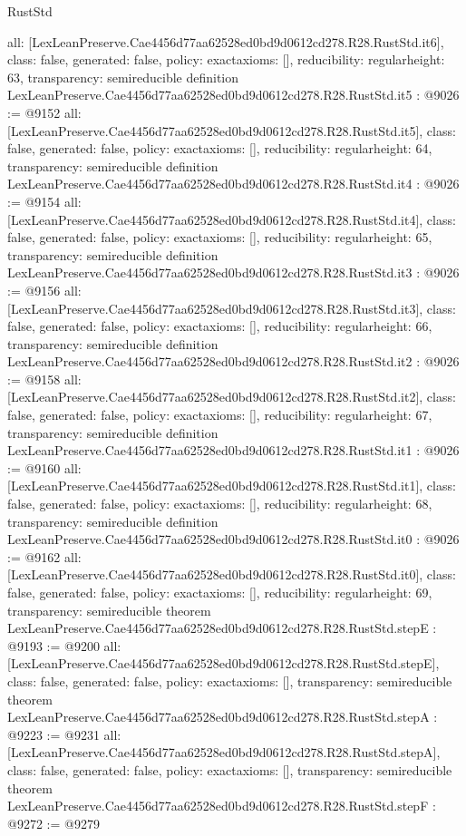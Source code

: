 \begin{lexlean}{RustStd}
\begin{coremodule}
{  all: [LexLeanPreserve.Cae4456d77aa62528ed0bd9d0612cd278.R28.RustStd.it6],
  class: false,
  generated: false,
  policy: exact{axioms: []},
  reducibility: regular{height: 63},
  transparency: semireducible
}
definition LexLeanPreserve.Cae4456d77aa62528ed0bd9d0612cd278.R28.RustStd.it5 : @9026 := @9152 {
  all: [LexLeanPreserve.Cae4456d77aa62528ed0bd9d0612cd278.R28.RustStd.it5],
  class: false,
  generated: false,
  policy: exact{axioms: []},
  reducibility: regular{height: 64},
  transparency: semireducible
}
definition LexLeanPreserve.Cae4456d77aa62528ed0bd9d0612cd278.R28.RustStd.it4 : @9026 := @9154 {
  all: [LexLeanPreserve.Cae4456d77aa62528ed0bd9d0612cd278.R28.RustStd.it4],
  class: false,
  generated: false,
  policy: exact{axioms: []},
  reducibility: regular{height: 65},
  transparency: semireducible
}
definition LexLeanPreserve.Cae4456d77aa62528ed0bd9d0612cd278.R28.RustStd.it3 : @9026 := @9156 {
  all: [LexLeanPreserve.Cae4456d77aa62528ed0bd9d0612cd278.R28.RustStd.it3],
  class: false,
  generated: false,
  policy: exact{axioms: []},
  reducibility: regular{height: 66},
  transparency: semireducible
}
definition LexLeanPreserve.Cae4456d77aa62528ed0bd9d0612cd278.R28.RustStd.it2 : @9026 := @9158 {
  all: [LexLeanPreserve.Cae4456d77aa62528ed0bd9d0612cd278.R28.RustStd.it2],
  class: false,
  generated: false,
  policy: exact{axioms: []},
  reducibility: regular{height: 67},
  transparency: semireducible
}
definition LexLeanPreserve.Cae4456d77aa62528ed0bd9d0612cd278.R28.RustStd.it1 : @9026 := @9160 {
  all: [LexLeanPreserve.Cae4456d77aa62528ed0bd9d0612cd278.R28.RustStd.it1],
  class: false,
  generated: false,
  policy: exact{axioms: []},
  reducibility: regular{height: 68},
  transparency: semireducible
}
definition LexLeanPreserve.Cae4456d77aa62528ed0bd9d0612cd278.R28.RustStd.it0 : @9026 := @9162 {
  all: [LexLeanPreserve.Cae4456d77aa62528ed0bd9d0612cd278.R28.RustStd.it0],
  class: false,
  generated: false,
  policy: exact{axioms: []},
  reducibility: regular{height: 69},
  transparency: semireducible
}
theorem LexLeanPreserve.Cae4456d77aa62528ed0bd9d0612cd278.R28.RustStd.stepE : @9193 := @9200 {
  all: [LexLeanPreserve.Cae4456d77aa62528ed0bd9d0612cd278.R28.RustStd.stepE],
  class: false,
  generated: false,
  policy: exact{axioms: []},
  transparency: semireducible
}
theorem LexLeanPreserve.Cae4456d77aa62528ed0bd9d0612cd278.R28.RustStd.stepA : @9223 := @9231 {
  all: [LexLeanPreserve.Cae4456d77aa62528ed0bd9d0612cd278.R28.RustStd.stepA],
  class: false,
  generated: false,
  policy: exact{axioms: []},
  transparency: semireducible
}
theorem LexLeanPreserve.Cae4456d77aa62528ed0bd9d0612cd278.R28.RustStd.stepF : @9272 := @9279 {
}
\end{coremodule}
\end{lexlean}
